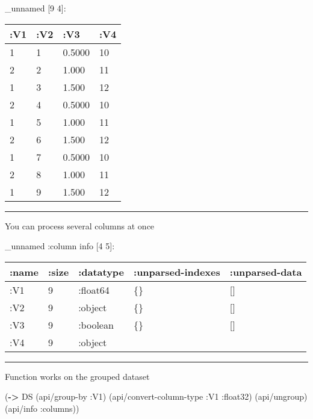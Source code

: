 \documentclass[]{article}
\newenvironment{Shaded}{\begin{snugshade}}{\end{snugshade}}
\newcommand{\KeywordTok}[1]{\textcolor[rgb]{0.13,0.29,0.53}{\textbf{#1}}}
\newcommand{\FloatTok}[1]{\textcolor[rgb]{0.00,0.00,0.81}{#1}}
\newcommand{\VariableTok}[1]{\textcolor[rgb]{0.00,0.00,0.00}{#1}}
\newcommand{\AttributeTok}[1]{\textcolor[rgb]{0.77,0.63,0.00}{#1}}
\newcommand{\NormalTok}[1]{#1}
\begin{document}
\_unnamed {[}9 4{]}:

\begin{longtable}[]{@{}llll@{}}
\toprule
:V1 & :V2 & :V3 & :V4\tabularnewline
\midrule
\endhead
1 & 1 & 0.5000 & 10\tabularnewline
2 & 2 & 1.000 & 11\tabularnewline
1 & 3 & 1.500 & 12\tabularnewline
2 & 4 & 0.5000 & 10\tabularnewline
1 & 5 & 1.000 & 11\tabularnewline
2 & 6 & 1.500 & 12\tabularnewline
1 & 7 & 0.5000 & 10\tabularnewline
2 & 8 & 1.000 & 11\tabularnewline
1 & 9 & 1.500 & 12\tabularnewline
\bottomrule
\end{longtable}

\begin{center}\rule{0.5\linewidth}{0.5pt}\end{center}

You can process several columns at once

\begin{Shaded}
\end{Shaded}

\_unnamed :column info {[}4 5{]}:

\begin{longtable}[]{@{}lllll@{}}
\toprule
:name & :size & :datatype & :unparsed-indexes &
:unparsed-data\tabularnewline
\midrule
\endhead
:V1 & 9 & :float64 & \{\} & {[}{]}\tabularnewline
:V2 & 9 & :object & \{\} & {[}{]}\tabularnewline
:V3 & 9 & :boolean & \{\} & {[}{]}\tabularnewline
:V4 & 9 & :object & &\tabularnewline
\bottomrule
\end{longtable}

\begin{center}\rule{0.5\linewidth}{0.5pt}\end{center}

Function works on the grouped dataset

\begin{Shaded}
\begin{Highlighting}[]
\NormalTok{(}\KeywordTok{->}\NormalTok{ DS}
\NormalTok{    (api/group-by }\AttributeTok{:V1}\NormalTok{)}
\NormalTok{    (api/convert-column-type }\AttributeTok{:V1} \AttributeTok{:float32}\NormalTok{)}
\NormalTok{    (api/ungroup)}
\NormalTok{    (api/info }\AttributeTok{:columns}\NormalTok{))}
\end{Highlighting}
\end{Shaded}
\end{document}
